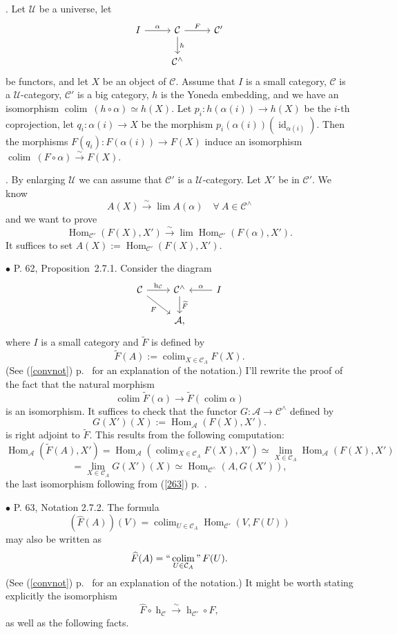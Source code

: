 \documentclass[12pt]{article}
\theoremstyle{remark}%
\newcommand{\bu}{\bullet}
\newcommand{\n}{\noindent}
\newcommand{\A}{\mathcal A}
\newcommand{\C}{\mathcal C}
\newcommand{\U}{\mathcal U}
\newcommand{\xr}{\xrightarrow}
\newcommand{\pr}{Proposition}
\newcommand{\cn}{(See (\ref{convnot}) p.~\pageref{convnot} for an explanation of the notation.) }
\DeclareMathOperator*{\coli}{colim}
\DeclareMathOperator*{\co}{colim}
\DeclareMathOperator*{\icolim}{``\coli"}
\DeclareMathOperator{\hy}{h}
\DeclareMathOperator{\id}{id}
\DeclareMathOperator{\Hom}{Hom}
\DeclareMathOperator{\h}{Hom}
\begin{document}
\n{\em Statement}. Let $\U$ be a universe, let  
$$
\begin{tikzcd}
I\ar{r}{\alpha}&\C\ar{d}{h}\ar{r}{F}&\C'\\
&\C^\wedge
\end{tikzcd}
$$ 
be functors, and let $X$ be an object of $\C$. Assume that $I$ is a small category, $\C$ is a $\U$-category, $\C'$ is a big category, $h$ is the Yoneda embedding, and we have an isomorphism $\co\ (h\circ\alpha)\simeq h(X)$. Let $p_i:h(\alpha(i))\to h(X)$ be the $i$-th coprojection, let $q_i:\alpha(i)\to X$ be the morphism $p_i(\alpha(i))(\id_{\alpha(i)})$. Then the morphisms $F(q_i):F(\alpha(i))\to F(X)$ induce an isomorphism $\co\ (F\circ\alpha)\xrightarrow\sim F(X)$. 

\n{\em Proof}. By enlarging $\U$ we can assume that $\C'$ is a $\U$-category. Let $X'$ be in $\C'$. We know 
$$
A(X)\xrightarrow\sim\lim A(\alpha)\quad\forall\ A\in\C^\wedge 
$$ 
and we want to prove 
$$
\h_{\C'}(F(X),X')\xrightarrow\sim\lim\h_{\C'}(F(\alpha),X'). 
$$ 
It suffices to set $A(X):=\h_{\C'}(F(X),X')$. 


\n$\bu$ P. 62, \pr\ 2.7.1. Consider the diagram 
%
\begin{equation}\label{271b}
\begin{tikzcd}
\C\ar{r}{\hy_\C}\ar{dr}[swap]{F}&\C^\wedge\ar{d}{\widetilde F}&I\ar{l}[swap]{\alpha}\\
&\A,
\end{tikzcd}
\end{equation} 
% 
where $I$ is a small category and $\widetilde F$ is defined by 
$$
\widetilde F(A):=\coli_{X\in\C_A}F(X). 
$$
\cn I'll rewrite the proof of the fact that the natural morphism 
%
$$
\coli\widetilde F(\alpha)\to
\widetilde F\left(\coli\alpha\right) 
$$ 
% 
is an isomorphism. It suffices to check that the functor $G:\A\to\C^\wedge$ defined by 
$$
G(X')(X):=\Hom_{\A}(F(X),X').
$$ 
is right adjoint to $\widetilde F$. This results from the following computation: 
$$
\Hom_{\A}\left(\widetilde F(A),X'\right)=
\Hom_{\A}\left(\coli_{X\in\C_A}F(X),X'\right)\simeq 
\lim_{X\in\C_A}\Hom_{\A}(F(X),X')
$$
$$
=\lim_{X\in\C_A}G(X')(X)\simeq\Hom_{\C^\wedge}(A,G(X')), 
$$ 
the last isomorphism following from (\ref{263}) p.~\pageref{263}. 


\n$\bu$ P. 63, Notation 2.7.2. The formula 
$$
(\widehat F(A))(V)=\coli_{U\in\C_A}\Hom_{\C'}(V,F(U))
$$
may also be written as 
$$
\widehat F(A)=\icolim_{U\in\C_A}F(U).
$$
\cn It might be worth stating explicitly the isomorphism 
$$
\widehat F\circ\hy_\C\xr\sim\hy_{\C'}\circ F,
$$
as well as the following facts. 
\end{document}
